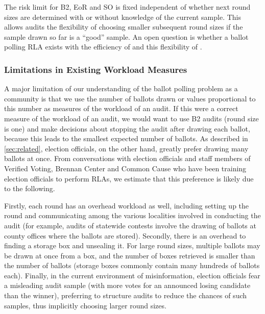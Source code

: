 
The risk limit for B2, EoR and SO \BRAVO is fixed independent of whether next round sizes are determined with or without knowledge of the current sample. This allows \BRAVO audits the flexibility of choosing smaller subsequent round sizes if the sample drawn so far is a ``good'' sample. An open question is whether a ballot polling RLA exists with the efficiency of \Minerva and this flexibility of \BRAVO.

\subsubsection{Limitations in Existing Workload Measures}
A major limitation of our understanding of the ballot polling problem as a community is that we use the number of ballots drawn or values proportional to this number \cite{mclaughlin_thesis,bernhard-diss,RI-report} as measures of the workload of an audit. If this were a correct measure of the workload of an audit, we would want to use B2 audits (round size is one) and make decisions about stopping the audit after drawing each ballot, because this leads to the smallest expected number of ballots. As described in \ref{sec:related}, election officials, on the other hand, greatly prefer drawing many ballots at once. From conversations with election officials and staff members of Verified Voting, Brennan Center and Common Cause who have been training election officials to perform RLAs, we estimate that this preference is likely due to the following. 

Firstly, each round has an overhead workload as well, including setting up the round and communicating among the various localities involved in conducting the audit (for example, audits of statewide contests involve the drawing of ballots at county offices where the ballots are stored). Secondly, there is an overhead to finding a storage box and unsealing it. For large round sizes, multiple ballots may be drawn at once from a box, and the number of boxes retrieved is smaller than the number of ballots (storage boxes commonly contain many hundreds of ballots each). 
Finally, in the current environment of misinformation, election officials fear a misleading audit sample (with more votes for an announced losing candidate than the winner), preferring to structure audits to reduce the chances of such samples, thus implicitly choosing larger round sizes. 


